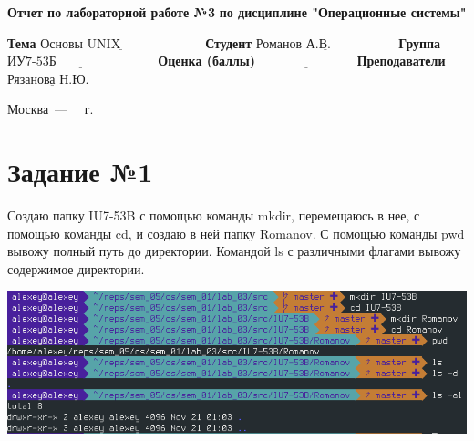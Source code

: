 \documentclass[12pt]{report}
\begin{document}
\begin{titlepage}
	
	\begin{center}
		\noindent\begin{minipage}{1.3\textwidth}\centering
			\Large\textbf{  Отчет по лабораторной работе №3}\newline
			\textbf{по дисциплине "Операционные системы"}\newline\newline
		\end{minipage}
	\end{center}
	
	\noindent\textbf{Тема} $\underline{\text{Основы UNIX~~~~~~~~~~~~~~~~~~~}}$\newline\newline
	\noindent\textbf{Студент} $\underline{\text{Романов А.В.~~~~~~~~~~~~~~~}}$\newline\newline
	\noindent\textbf{Группа} $\underline{\text{ИУ7-53Б~~~~~~~~~~~~~~~~~~~~~~~}}$\newline\newline
	\noindent\textbf{Оценка (баллы)} $\underline{\text{~~~~~~~~~~~~~~~~~~~~~~}}$\newline\newline
	\noindent\textbf{Преподаватели} $\underline{\text{Рязанова Н.Ю.~~}}$\newline\newline\newline
	
	\begin{center}
		\vfill
		Москва~---~\the\year
		~г.
	\end{center}
\end{titlepage}

\newpage

\chapter{Задание №1}

Создаю папку IU7-53B с помощью команды mkdir, перемещаюсь в нее, с помощью команды cd, и создаю в ней папку Romanov. С помощью команды pwd вывожу полный путь до директории. Командой ls с различными флагами вывожу содержимое директории. 

\includegraphics[width=\linewidth]{img/task01.png}
\end{document}
